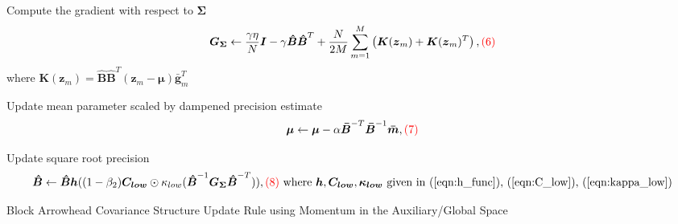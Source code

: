\documentclass[a4paper, 11pt, oneside]{scrartcl}
\theoremstyle{break}
\newcommand{\matr}[1]{\boldsymbol{#1}}
\numberwithin{equation}{section}
\begin{document}
\begin{algorithm}[!htbp]
{						Compute the gradient with respect to $\matr{\Sigma}$
						$$\matr{G_{\Sigma}} \leftarrow \frac{\gamma \eta}{N} \matr{I} - \gamma\matr{\hat{B}} \matr{\hat{B}}^T + \frac{N}{2M} \sum_{m=1}^M \left( \matr{K}(\matr{z}_m) + \matr{K}(\matr{z}_m)^T \right), \color{red} \text{(6)} \color{black}$$
						where $\matr{K}(\matr{z}_m) = \matr{\hat{B}} \matr{\hat{B}}^T (\matr{z}_m - \matr{\mu}) \matr{\bar{g}}_m^T$

						Update mean parameter scaled by dampened precision estimate
						$$\matr{\mu} \leftarrow \matr{\mu} - \alpha \matr{\bar{B}}^{-T} \matr{\bar{B}}^{-1} \matr{\bar{m}}, \color{red} \text{(7)} \color{black}$$

						Update square root precision
						$$\matr{\hat{B}} \leftarrow \matr{\hat{B}} \matr{h}((1 - \beta_2) \matr{C_{low}} \odot \kappa_{low}(\matr{\hat{B}}^{-1} \matr{G_{\Sigma}} \matr{\hat{B}}^{-T})), \color{red} \text{(8)} \color{black} \text{ where } \matr{h}, \matr{C_{low}}, \matr{\kappa_{low}}\text{ given in (\ref{eqn:h_func}), (\ref{eqn:C_low}), (\ref{eqn:kappa_low})}$$%
					}
					\caption{Block Arrowhead Covariance Structure Update Rule using Momentum in the Auxiliary/Global Space}
					\label{alg:arrowhead}
				\end{algorithm}
\end{document}

